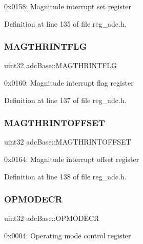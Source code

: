 0x0158\+: Magnitude interrupt set register 

Definition at line 135 of file reg\+\_\+adc.\+h.

\mbox{\label{structadcBase_ad0f80bc0820675e69239c9c7da2ca327}} 
\subsubsection{\texorpdfstring{M\+A\+G\+T\+H\+R\+I\+N\+T\+F\+LG}{MAGTHRINTFLG}}
{\footnotesize\ttfamily uint32 adc\+Base\+::\+M\+A\+G\+T\+H\+R\+I\+N\+T\+F\+LG}

0x0160\+: Magnitude interrupt flag register 

Definition at line 137 of file reg\+\_\+adc.\+h.

\mbox{\label{structadcBase_a4a186dceffea69d5f941f3fffb69af40}} 
\subsubsection{\texorpdfstring{M\+A\+G\+T\+H\+R\+I\+N\+T\+O\+F\+F\+S\+ET}{MAGTHRINTOFFSET}}
{\footnotesize\ttfamily uint32 adc\+Base\+::\+M\+A\+G\+T\+H\+R\+I\+N\+T\+O\+F\+F\+S\+ET}

0x0164\+: Magnitude interrupt offset register 

Definition at line 138 of file reg\+\_\+adc.\+h.

\mbox{\label{structadcBase_a405e39a2253358f33354e2ce981a6074}} 
\subsubsection{\texorpdfstring{O\+P\+M\+O\+D\+E\+CR}{OPMODECR}}
{\footnotesize\ttfamily uint32 adc\+Base\+::\+O\+P\+M\+O\+D\+E\+CR}

0x0004\+: Operating mode control register 

